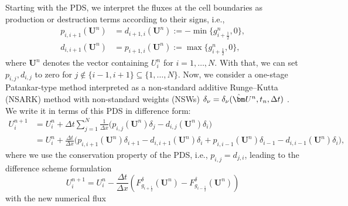 \documentclass[final,11pt, times, linenumber, nopreprintline]{elsarticle}
\newcommand{\bU}{\bm U}
\begin{document}
Starting with the PDS, we interpret the fluxes at the cell boundaries as production or destruction terms according to their signs, i.e., 
\begin{equation}
\begin{aligned}
	p_{i,i+1}(\bU^{n}) &= d_{i+1,i}(\bU^{n}) := -\min\bigl\{g_{i+\frac{1}{2}}^n,0\bigr\}, \\
	d_{i,i+1}(\bU^{n}) &= p_{i+1,i}(\bU^{n}) := \max\bigl\{g_{i+\frac{1}{2}}^n,0\bigr\},
	\label{eq:prod_dest}
    \end{aligned}
\end{equation}
where $\bU^n$ denotes the vector containing $U_i^n$ for $i=1, \dots, N$. 
With that, we can set $p_{i,j}, d_{i,j}$ to zero for $j \notin \{i-1,i+1\}\subseteq\{1,\dotsc,N\}$.
Now, we consider a one-stage Patankar-type method interpreted as a non-standard additive Runge--Kutta (NSARK) method with non-standard weights (NSWs) $\delta_\nu = \delta_\nu(\hat\bU^n,t_n, \Delta t)$ \cite{IzginThesis}. We write it in terms of this PDS in difference form:
\begin{equation}
	\begin{split}
		U_i^{n+1} &= U_i^n + \Delta t \sum_{j = 1}^N \frac{1}{\Delta x}\biggl(  p_{i,j}(\bU^n)\delta_j - d_{i,j}(\bU^n)\delta_i \biggr) \\
		&= U_i^n + \frac{\Delta t}{\Delta x} \biggl(p_{i,i+1}(\bU^{n})\delta_{i+1} - d_{i,i+1}(\bU^{n})\delta_i + p_{i,i-1}(\bU^{n}) \delta_{i-1} - d_{i,i-1}(\bU^{n})\delta_i \biggr),
	\end{split}
	\label{eq:MPRK_difference}
\end{equation}
where we use the conservation property of the PDS, i.e., $p_{i,j}=d_{j,i}$, leading to the difference scheme formulation 
\begin{equation*}
    U^{n+1}_i = U^n_i - \frac{\Delta t}{\Delta x} \left( F^{\delta}_{g_{i+\frac{1}{2}}}(\bU^n) -F^{\delta}_{g_{i-\frac{1}{2}}}(\bU^n) \right)
\end{equation*}
with the new numerical flux
\end{document}
